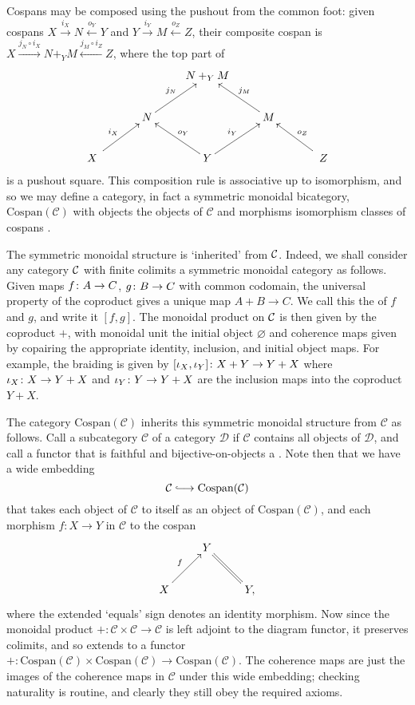 Cospans may be composed using the pushout from the common
foot: given cospans $X \stackrel{i_X}{\longrightarrow} N
\stackrel{o_Y}{\longleftarrow} Y$ and $Y \stackrel{i_Y}{\longrightarrow} M
\stackrel{o_Z}{\longleftarrow} Z$, their composite cospan is $X \stackrel{j_N
\circ i_X}{\longrightarrow} N+_YM \stackrel{j_M\circ i_Z}{\longleftarrow} Z$,
where the top part of
\[
  \xymatrix{
    && N+_YM \\
    & N \ar[ur]^{j_N} && M \ar[ul]_{j_M} \\
    \quad X \quad \ar[ur]^{i_X} && Y \ar[ul]_{o_Y} \ar[ur]^{i_Y} && \quad Z \quad \ar[ul]_{o_Z}
  }
\]
is a pushout square. This composition rule is associative up to isomorphism, and
so we may define a category, in fact a symmetric monoidal bicategory,
$\mathrm{Cospan}(\mathcal C)$ with objects the objects of $\mathcal C$ and
morphisms isomorphism classes of cospans \cite{Ben}.

The symmetric monoidal structure is `inherited' from $\mathcal C$. Indeed, we shall
consider any category $\mathcal C$ with finite colimits a symmetric monoidal category
as follows. Given maps $f {\colon} A \to C$, $g {\colon} B \to C$ with common
codomain, the universal property of the coproduct gives a unique map $A+B \to
C$. We call this the  of $f$ and $g$, and write it $[f,g]$. The
monoidal product on $\mathcal C$ is then given by the coproduct $+$, with monoidal
unit the initial object $\varnothing$ and coherence maps given by copairing the
appropriate identity, inclusion, and initial object maps. For example, the
braiding is given by $[\iota_X,\iota_Y]{\colon} X+Y \to Y+X$ where $\iota_X{\colon} X
\to Y+X$ and $\iota_Y{\colon} Y \to Y+X$ are the inclusion maps into the coproduct
$Y+X$.

The category $\mathrm{Cospan(\mathcal C)}$ inherits this symmetric monoidal
structure from $\mathcal C$ as follows. Call a subcategory $\mathcal C$ of a
category $\mathcal D$  if $\mathcal C$ contains all objects of
$\mathcal D$, and call a functor that is faithful and bijective-on-objects a
.  Note then that we have a wide embedding
\[
  \mathcal C \hooklongrightarrow \mathrm{Cospan(\mathcal C)}
\]
that takes each object of $\mathcal C$ to itself as an object of
$\mathrm{Cospan(\mathcal C)}$, and each morphism $f\colon  X \to Y$ in $\mathcal
C$ to the cospan
\[
  \xymatrix{
    & Y \\
    X \ar[ur]^{f} && Y, \ar@{=}[ul]
  }
\]
where the extended `equals' sign denotes an identity morphism. Now since the
monoidal product $+\colon \mathcal C \times \mathcal C \to \mathcal C$ is left
adjoint to the diagram functor, it preserves colimits, and so extends to a
functor $+\colon \mathrm{Cospan(\mathcal C)} \times \mathrm{Cospan(\mathcal C)}
\to \mathrm{Cospan(\mathcal C)}$. The coherence maps are just the images of the
coherence maps in $\mathcal C$ under this wide embedding; checking naturality is
routine, and clearly they still obey the required axioms.

